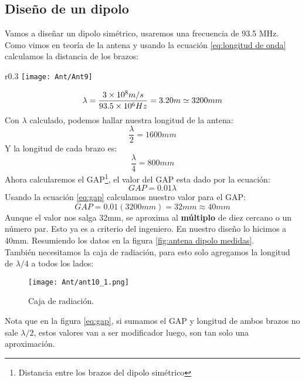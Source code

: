 \documentclass[
	12pt, %
	fleqn, %
	a4paper, %
	oneside, %
]{LegrandOrangeBook}
\begin{document}
\subsection{Diseño de un dipolo}
Vamos a diseñar un dipolo simétrico, usaremos una frecuencia de 93.5 MHz. Como vimos en teoría de la antena y usando la ecuación \ref{eq:longitud de onda} calculamos la distancia de los brazos:
\begin{wrapfigure}{r}{0.3\linewidth}
	\centering
    \texttt{[image: Ant/Ant9]}
  \caption{Longitudes del dipolo.}
  \label{fig:antena dipolo medidas}
\end{wrapfigure}
\begin{displaymath}
\lambda=\frac{3\times 10^{8}m/s}{93.5\times 10^{6}Hz}=3.20 m\simeq 3200mm
\end{displaymath}
Con $\lambda$ calculado, podemos hallar nuestra longitud de la antena:
\begin{displaymath}
\frac{\lambda}{2}=1600mm
\end{displaymath}
Y la longitud de cada brazo es:
\begin{displaymath}
\frac{\lambda}{4}=800mm
\end{displaymath}
Ahora calcularemos el GAP\footnote{Distancia entre los brazos del dipolo simétrico}, el valor del GAP esta dado por la ecuación:
\begin{equation}
GAP=0.01\lambda
\label{eq:gap}
\end{equation}
Usando la ecuación \ref{eq:gap} calculamos nuestro valor para el GAP:
\begin{displaymath}
GAP=0.01(3200mm)=32mm\approx 40mm
\end{displaymath}
Aunque el valor nos salga 32mm, se aproxima al \textbf{múltiplo} de diez cercano o un número par. Esto ya es a criterio del ingeniero. En nuestro diseño lo hicimos a 40mm.
Resumiendo los datos en la figura \ref{fig:antena dipolo medidas}.\\
También necesitamos la caja de radiación, para esto solo agregamos la longitud de $\lambda/4$ a todos los lados:
\begin{figure}[H]
\centering
\texttt{[image: Ant/ant10\_1.png]}
\caption{Caja de radiación.}
\end{figure}
\begin{notation}
Nota que en la figura \ref{eq:gap}, si sumamos el GAP y longitud de ambos brazos no sale $\lambda/2$, estos valores van a ser modificador luego, son tan solo una aproximación.
\end{notation}
\end{document}
